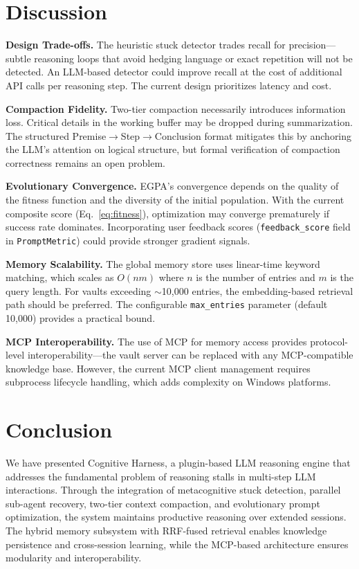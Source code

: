 \documentclass[conference]{IEEEtran}
\begin{document}
\section{Discussion}
\label{sec:discussion}

\textbf{Design Trade-offs.} The heuristic stuck detector trades recall for precision---subtle reasoning loops that avoid hedging language or exact repetition will not be detected. An LLM-based detector could improve recall at the cost of additional API calls per reasoning step. The current design prioritizes latency and cost.

\textbf{Compaction Fidelity.} Two-tier compaction necessarily introduces information loss. Critical details in the working buffer may be dropped during summarization. The structured Premise$\rightarrow$Step$\rightarrow$Conclusion format mitigates this by anchoring the LLM's attention on logical structure, but formal verification of compaction correctness remains an open problem.

\textbf{Evolutionary Convergence.} EGPA's convergence depends on the quality of the fitness function and the diversity of the initial population. With the current composite score (Eq.~\ref{eq:fitness}), optimization may converge prematurely if success rate dominates. Incorporating user feedback scores (\texttt{feedback\_score} field in \texttt{PromptMetric}) could provide stronger gradient signals.

\textbf{Memory Scalability.} The global memory store uses linear-time keyword matching, which scales as $O(nm)$ where $n$ is the number of entries and $m$ is the query length. For vaults exceeding $\sim$10,000 entries, the embedding-based retrieval path should be preferred. The configurable \texttt{max\_entries} parameter (default 10,000) provides a practical bound.

\textbf{MCP Interoperability.} The use of MCP for memory access provides protocol-level interoperability---the vault server can be replaced with any MCP-compatible knowledge base. However, the current MCP client management requires subprocess lifecycle handling, which adds complexity on Windows platforms.

\section{Conclusion}
\label{sec:conclusion}

We have presented Cognitive Harness, a plugin-based LLM reasoning engine that addresses the fundamental problem of reasoning stalls in multi-step LLM interactions. Through the integration of metacognitive stuck detection, parallel sub-agent recovery, two-tier context compaction, and evolutionary prompt optimization, the system maintains productive reasoning over extended sessions. The hybrid memory subsystem with RRF-fused retrieval enables knowledge persistence and cross-session learning, while the MCP-based architecture ensures modularity and interoperability.
\end{document}
